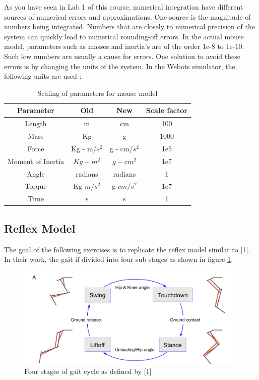\documentclass{cmc}
\begin{document}
As you have seen in Lab 1 of this course, numerical integration have
different sources of numerical errors and approximations. One source
is the magnitude of numbers being integrated. Numbers that are closely
to numerical precision of the system can quickly lead to numerical
rounding-off errors. In the actual mouse model, parameters such as
masses and inertia's are of the order 1e-8 to 1e-10. Such low numbers
are usually a cause for errors.  One solution to avoid these errors is
by changing the units of the system. In the Webots simulator, the
following units are used :

\begin{table}[H]
  \centering
  \begin{tabular}{|c|c|c|c|}
    \hline
    \textbf{Parameter} & \textbf{Old} & \textbf{New} & \textbf{Scale factor} \\ \hline
    Length & m & cm & 100 \\ \hline
    Mass & Kg & g & 1000 \\ \hline
    Force & Kg - m/$s^2$ & g - cm/$s^2$ & 1e5 \\ \hline
    Moment of Inertia & $Kg-m^2$ & $g-cm^2$ & 1e7 \\ \hline
    Angle & radians & radians & 1 \\ \hline
    Torque & Kg-$m/s^2$ & g-$cm/s^2$ & 1e7 \\ \hline
    Time & s & s & 1 \\ \hline
  \end{tabular} 
  \caption{Scaling of parameters for mouse model}
\end{table}

\newpage
\subsection*{Reflex Model}
\label{sec:reflex-model}

The goal of the following exercises is to replicate the reflex model
similar to [1].  In their work, the gait if divided into four sub
stages as shown in figure \ref{fig:ekeberg_gait}.

\begin{figure}[H]
  \centering \includegraphics[width=\textwidth]{figures/ekeberg_gait}
  \caption[ekeberg gait phases]{Four stages of gait cycle as defined
    by [1] }
  \label{fig:ekeberg_gait}
\end{figure}
\end{document}

